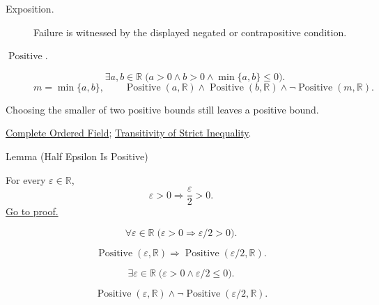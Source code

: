 \begin{remark*}
\begin{description}
  \item[Exposition.]
  Failure is witnessed by the displayed negated or contrapositive condition.

  \item[\(\operatorname{Positive}.\)]
  \[
\exists a,b\in\mathbb{R}\;\bigl(a>0\land b>0\land \min\{a,b\}\leq 0\bigr).
\]
\[
m=\min\{a,b\},\qquad
\operatorname{Positive}(a,\mathbb{R})\land\operatorname{Positive}(b,\mathbb{R})\land
\neg\operatorname{Positive}(m,\mathbb{R}).
\]
\end{description}
\end{remark*}
\begin{remark*}[Interpretation]
Choosing the smaller of two positive bounds still leaves a positive bound.
\end{remark*}
\begin{dependencies}
\hyperref[def:real-ordered-field]{Complete Ordered Field};
\hyperref[thm:ineq-transitivity-strict]{Transitivity of Strict Inequality}.
\end{dependencies}

\begin{lemmabox}{Lemma (Half Epsilon Is Positive)}
\begin{lemma}
\label{lem:half-epsilon-is-positive}
For every $\varepsilon\in\mathbb{R}$,
\[
  \varepsilon>0
  \Longrightarrow
  \frac{\varepsilon}{2}>0.
\]
\hyperref[prf:half-epsilon-is-positive]{Go to proof.}
\end{lemma}
\end{lemmabox}
\begin{remark*}
\[
\forall \varepsilon\in\mathbb{R}\;\bigl(\varepsilon>0\Longrightarrow \varepsilon/2>0\bigr).
\]
\end{remark*}
\begin{remark*}
\[
\operatorname{Positive}(\varepsilon,\mathbb{R})\Longrightarrow
\operatorname{Positive}(\varepsilon/2,\mathbb{R}).
\]
\end{remark*}
\begin{remark*}
\[
\exists\varepsilon\in\mathbb{R}\;\bigl(\varepsilon>0\land \varepsilon/2\leq 0\bigr).
\]
\end{remark*}
\begin{remark*}
\[
\operatorname{Positive}(\varepsilon,\mathbb{R})\land\neg\operatorname{Positive}(\varepsilon/2,\mathbb{R}).
\]
\end{remark*}

